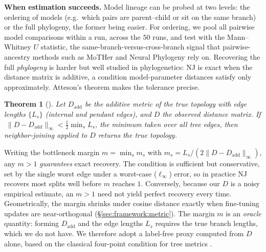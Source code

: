 \documentclass{article}
\newtheorem{theorem}{Theorem}
\theoremstyle{definition}
\theoremstyle{plain}
\begin{document}
\textbf{When estimation succeeds.}\label{sec:framework:theory}
Model lineage can be probed at two levels: the ordering of models (e.g.\ which pairs are parent--child
or sit on the same branch) or the full phylogeny, the former being easier. For ordering, we pool all
pairwise model comparisons within a run, across the $50$ runs, and test with the Mann--Whitney $U$
statistic, the same-branch-versus-cross-branch signal that pairwise-ancestry methods such as MoTHer
\citep{horwitz2025mother} and Neural Phylogeny \citep{yu2025neural} rely on. Recovering the full
\textit{phylogeny} is harder but well studied in phylogenetics: NJ is exact when the distance matrix is
additive, a condition model-parameter distances satisfy only approximately. Atteson's theorem makes the
tolerance precise.
\begin{theorem}[\citealp{atteson1999performance}]\label{thm:atteson}
Let $D_{\mathrm{add}}$ be the additive metric of the true topology with edge lengths
$\{L_s\}$ (internal and pendant edges), and $D$ the observed distance matrix. If
$\;\lVert D-D_{\mathrm{add}}\rVert_\infty < \tfrac12\min_s L_s$, the minimum taken over all tree edges,
then neighbor-joining applied to $D$ returns the true topology.
\end{theorem}
Writing the bottleneck margin $m=\min_s m_s$ with $m_s=L_s/(2\lVert D-D_{\mathrm{add}}\rVert_\infty)$, any
$m>1$ \emph{guarantees} exact recovery. The condition is sufficient but conservative, set by the single
worst edge under a worst-case ($\ell_\infty$) error, so in practice NJ recovers most splits well before
$m$ reaches $1$. Conversely, because our $D$ is a noisy empirical estimate, an $m>1$ need not yield
perfect recovery every time. Geometrically, the margin shrinks under cosine distance exactly when
fine-tuning updates are near-orthogonal (\S\ref{sec:framework:metric}). The margin $m$ is an
\emph{oracle} quantity: forming $D_{\mathrm{add}}$ and the edge lengths $L_s$ requires the true branch
lengths, which we do not have. We therefore adopt a label-free proxy computed from $D$ alone, based on
the classical four-point condition for tree metrics \citep{sempleSteel2003phylogenetics}.
\end{document}
